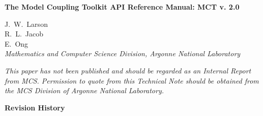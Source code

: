 \documentclass{article}
\begin{document}
\begin{sloppypar}
{\huge\bf
The Model Coupling Toolkit API Reference Manual: MCT v. 2.0
\\ }                     %
\end{sloppypar}

\vspace{.3in}
J.~W.~Larson\\
R.~L.~Jacob\\
E.~Ong\\
\vspace{.2in} {\em Mathematics and Computer Science Division,
Argonne National Laboratory\\}

\vfill

{\em This paper has not been published and should  be regarded as
an Internal Report from MCS. Permission to quote from this
Technical Note should be  obtained from the MCS Division of
Argonne National Laboratory.}

\vspace{0.4in}


\thispagestyle{empty}
\newpage




\newpage
\setcounter{page}{2}     %


\vspace*{\fill}

\centerline{\huge\bf Revision History}

\bigskip
{}
\end{document}
